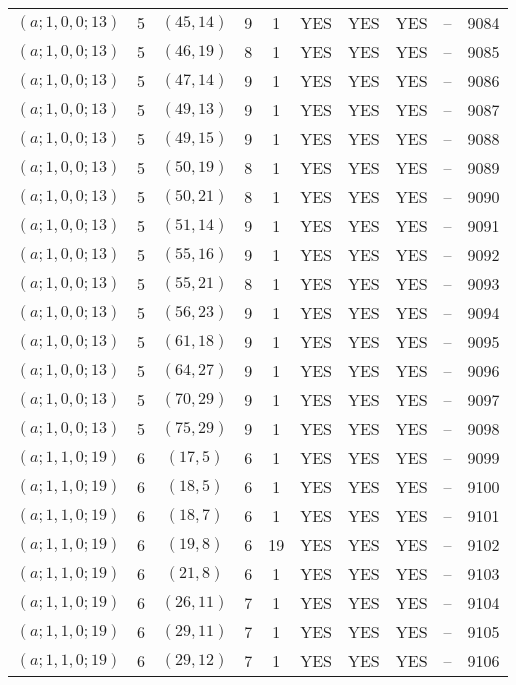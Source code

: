 \begin{longtable}{|c|c|c|c|c|c|c|c|c|c|}
$(a; 1, 0, 0; 13)$ & 5 & $(45, 14)$ & 9 & 1 & YES & YES & YES & -- & 9084\\
$(a; 1, 0, 0; 13)$ & 5 & $(46, 19)$ & 8 & 1 & YES & YES & YES & -- & 9085\\
$(a; 1, 0, 0; 13)$ & 5 & $(47, 14)$ & 9 & 1 & YES & YES & YES & -- & 9086\\
$(a; 1, 0, 0; 13)$ & 5 & $(49, 13)$ & 9 & 1 & YES & YES & YES & -- & 9087\\
$(a; 1, 0, 0; 13)$ & 5 & $(49, 15)$ & 9 & 1 & YES & YES & YES & -- & 9088\\
$(a; 1, 0, 0; 13)$ & 5 & $(50, 19)$ & 8 & 1 & YES & YES & YES & -- & 9089\\
$(a; 1, 0, 0; 13)$ & 5 & $(50, 21)$ & 8 & 1 & YES & YES & YES & -- & 9090\\
$(a; 1, 0, 0; 13)$ & 5 & $(51, 14)$ & 9 & 1 & YES & YES & YES & -- & 9091\\
$(a; 1, 0, 0; 13)$ & 5 & $(55, 16)$ & 9 & 1 & YES & YES & YES & -- & 9092\\
$(a; 1, 0, 0; 13)$ & 5 & $(55, 21)$ & 8 & 1 & YES & YES & YES & -- & 9093\\
$(a; 1, 0, 0; 13)$ & 5 & $(56, 23)$ & 9 & 1 & YES & YES & YES & -- & 9094\\
$(a; 1, 0, 0; 13)$ & 5 & $(61, 18)$ & 9 & 1 & YES & YES & YES & -- & 9095\\
$(a; 1, 0, 0; 13)$ & 5 & $(64, 27)$ & 9 & 1 & YES & YES & YES & -- & 9096\\
$(a; 1, 0, 0; 13)$ & 5 & $(70, 29)$ & 9 & 1 & YES & YES & YES & -- & 9097\\
$(a; 1, 0, 0; 13)$ & 5 & $(75, 29)$ & 9 & 1 & YES & YES & YES & -- & 9098\\
$(a; 1, 1, 0; 19)$ & 6 & $(17, 5)$ & 6 & 1 & YES & YES & YES & -- & 9099\\
$(a; 1, 1, 0; 19)$ & 6 & $(18, 5)$ & 6 & 1 & YES & YES & YES & -- & 9100\\
$(a; 1, 1, 0; 19)$ & 6 & $(18, 7)$ & 6 & 1 & YES & YES & YES & -- & 9101\\
$(a; 1, 1, 0; 19)$ & 6 & $(19, 8)$ & 6 & 19 & YES & YES & YES & -- & 9102\\
$(a; 1, 1, 0; 19)$ & 6 & $(21, 8)$ & 6 & 1 & YES & YES & YES & -- & 9103\\
$(a; 1, 1, 0; 19)$ & 6 & $(26, 11)$ & 7 & 1 & YES & YES & YES & -- & 9104\\
$(a; 1, 1, 0; 19)$ & 6 & $(29, 11)$ & 7 & 1 & YES & YES & YES & -- & 9105\\
$(a; 1, 1, 0; 19)$ & 6 & $(29, 12)$ & 7 & 1 & YES & YES & YES & -- & 9106\\

\end{longtable}
